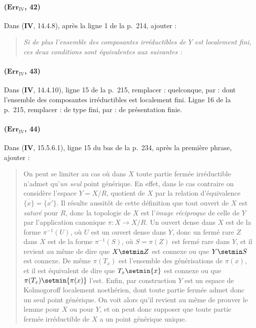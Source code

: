 \paragraph{($\mathbf{Err}_{\mathrm{IV}}$, 42)}
Dans (\textbf{IV}, 14.4.8), après la ligne 1 de la p.~214, ajouter :
\begin{quote}
\emph{Si de plus l'ensemble des composantes irréductibles de $Y$ est
localement fini, ces deux conditions sont équivalentes aux suivantes :}
\end{quote}

\paragraph{($\mathbf{Err}_{\mathrm{IV}}$, 43)}
Dans (\textbf{IV}, 14.4.10), ligne 15 de la p.~215, remplacer : quelconque, par :
dont l'ensemble des composantes irréductibles est localement fini.
Ligne 16 de la p.~215, remplacer : de type fini, par : de présentation
finie.

\paragraph{($\mathbf{Err}_{\mathrm{IV}}$, 44)}
Dans (\textbf{IV}, 15.5.6.1), ligne 15 du bas de la p.~234, après la première
phrase, ajouter :

\begin{quote}
On peut se limiter au cas où dans $X$ toute partie fermée irréductible
n'admet qu'\emph{un seul} point générique. En effet, dans le cas contraire on
considère l'espace $Y=X/R$,
quotient de $X$ par la relation d'équivalence
$\overline{\{x\}}=\overline{\{x'\}}$. Il résulte aussitôt de cette
définition que tout ouvert de $X$ est \emph{saturé} pour $R$, donc la topologie
de $X$ est l'\emph{image réciproque} de celle de $Y$ par l'application
canonique $\pi:X\to X/R$. Un ouvert dense dans $X$ est de la forme
$\pi^{-1}(U)$, où $U$ est un ouvert dense dans $Y$, donc un fermé rare
$Z$ dans $X$ est de la forme $\pi^{-1}(S)$, où $S=\pi(Z)$ est fermé
rare dans $Y$, et il revient au même de dire que $X\setmin Z$ est connexe ou
que $Y\setmin S$ est connexe. De même $\pi(T_x)$ est l'ensemble des
générisations de $\pi(x)$, et il est équivalent de dire que
$T_x\setmin\{x\}$ est connexe ou que $\pi(T_x)\setmin\{\pi(x)\}$ l'est. Enfin, par
construction $Y$ est un espace de Kolmogoroff localement noethérien,
dont toute partie fermée admet donc un seul point générique. On voit
alors qu'il revient au même de prouver le lemme pour $X$ ou pour $Y$,
et on peut donc supposer que toute partie fermée irréductible de $X$ a
un point générique unique.
\end{quote}

